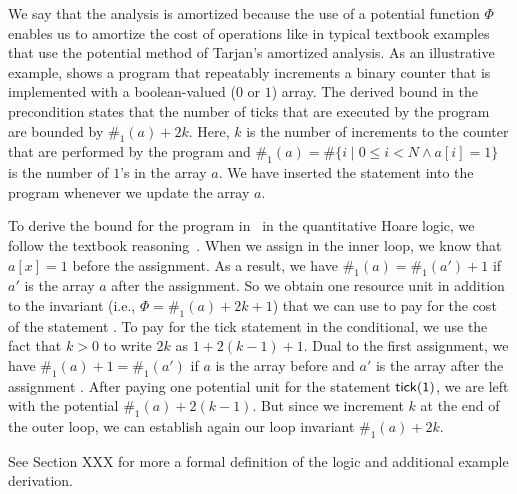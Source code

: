 \documentclass[nocopyrightspace,preprint]{sigplanconf}
\newcommand{\pref}[1]{\prettyref{#1}}
\begin{document}
We say that the analysis is amortized because the use of a potential
function $\Phi$ enables us to amortize the cost of operations like in
typical textbook examples that use the potential method of Tarjan's
amortized analysis.  As an illustrative example, \pref{fig:xmplinc}
shows a program that repeatably increments a binary counter that is
implemented with a boolean-valued ($0$ or $1$) array.  The derived
bound in the precondition states that the number of ticks that are
executed by the program are bounded by $\#_1(a) + 2k$.  Here, $k$ is
the number of increments to the counter that are performed by the
program and $ \#_1(a) = \# \{ i \mid 0 \le i < N \land a[i] = 1 \}$ is
the number of $1$'s in the array $a$.  We have inserted the statement
 into the program whenever we update the array $a$.

To derive the bound for the program in~\pref{fig:xmplinc} in the
quantitative Hoare logic, we follow the textbook
reasoning~\cite{Algorithms}.  When we assign  in the
inner loop, we know that $a[x]=1$ before the assignment.  As a result,
we have $\#_1(a) = \#_1(a') + 1$ if $a'$ is the array $a$ after the
assignment.  So we obtain one resource unit in addition to the
invariant (i.e., $\Phi = \#_1(a) + 2k + 1$) that we can use to pay for the
cost of the statement .  To pay for the tick statement
in the conditional, we use the fact that $k>0$ to write $2k$ as $1 +
2(k-1) +1$.  Dual to the first assignment, we have $\#_1(a) +1 =
\#_1(a')$ if $a$ is the array before and $a'$ is the array after the
assignment .  After paying one potential unit for the
statement $\mathsf{tick(1)}$, we are left with the potential $\#_1(a) +
2(k - 1)$.  But since we increment $k$ at the end of the outer loop,
we can establish again our loop invariant $\#_1(a) + 2k$.

See Section XXX for more a formal definition of the logic and
additional example derivation.

\end{document}
